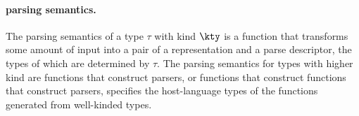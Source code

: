 





\paragraph*{\ddc{} parsing semantics.}
\label{sec:parse-sem}
The parsing semantics of a type $\tau$ with kind $\kty$ is a function that
transforms some amount of input into a pair of a representation and a
parse descriptor, the types of which are determined by $\tau$.  The
parsing semantics for types with higher kind are functions that
construct parsers, or functions that construct functions that
construct parsers, \etc{}  specifies
the host-language types of the functions generated from well-kinded
\ddc{} types.

